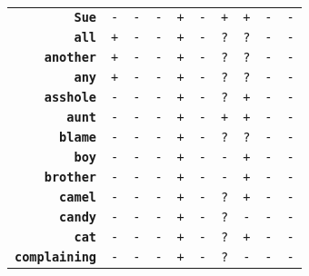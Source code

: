 \documentclass{article}
\begin{document}
\begin{minipage}{\textwidth}
{\begin{tabular}{|r|c|c|c|c|c|c|c|c|c|}
    \textbf{\texttt{Sue}} & \texttt{-}
    & \texttt{-} & \texttt{-}
    & \texttt{+} & \texttt{-}
    & \texttt{+} & \texttt{+}
    & \texttt{-} & \texttt{-} \\
    \textbf{\texttt{all}} & \texttt{+}
    & \texttt{-} & \texttt{-}
    & \texttt{+} & \texttt{-}
    & \texttt{?} & \texttt{?}
    & \texttt{-} & \texttt{-} \\
    \textbf{\texttt{another}} & \texttt{+}
    & \texttt{-} & \texttt{-}
    & \texttt{+} & \texttt{-}
    & \texttt{?} & \texttt{?}
    & \texttt{-} & \texttt{-} \\
    \textbf{\texttt{any}} & \texttt{+}
    & \texttt{-} & \texttt{-}
    & \texttt{+} & \texttt{-}
    & \texttt{?} & \texttt{?}
    & \texttt{-} & \texttt{-} \\
    \textbf{\texttt{asshole}} & \texttt{-}
    & \texttt{-} & \texttt{-}
    & \texttt{+} & \texttt{-}
    & \texttt{?} & \texttt{+}
    & \texttt{-} & \texttt{-} \\
    \textbf{\texttt{aunt}} & \texttt{-}
    & \texttt{-} & \texttt{-}
    & \texttt{+} & \texttt{-}
    & \texttt{+} & \texttt{+}
    & \texttt{-} & \texttt{-} \\
    \textbf{\texttt{blame}} & \texttt{-}
    & \texttt{-} & \texttt{-}
    & \texttt{+} & \texttt{-}
    & \texttt{?} & \texttt{?}
    & \texttt{-} & \texttt{-} \\
    \textbf{\texttt{boy}} & \texttt{-}
    & \texttt{-} & \texttt{-}
    & \texttt{+} & \texttt{-}
    & \texttt{-} & \texttt{+}
    & \texttt{-} & \texttt{-} \\
    \textbf{\texttt{brother}} & \texttt{-}
    & \texttt{-} & \texttt{-}
    & \texttt{+} & \texttt{-}
    & \texttt{-} & \texttt{+}
    & \texttt{-} & \texttt{-} \\
    \textbf{\texttt{camel}} & \texttt{-}
    & \texttt{-} & \texttt{-}
    & \texttt{+} & \texttt{-}
    & \texttt{?} & \texttt{+}
    & \texttt{-} & \texttt{-} \\
    \textbf{\texttt{candy}} & \texttt{-}
    & \texttt{-} & \texttt{-}
    & \texttt{+} & \texttt{-}
    & \texttt{?} & \texttt{-}
    & \texttt{-} & \texttt{-} \\
    \textbf{\texttt{cat}} & \texttt{-}
    & \texttt{-} & \texttt{-}
    & \texttt{+} & \texttt{-}
    & \texttt{?} & \texttt{+}
    & \texttt{-} & \texttt{-} \\
    \textbf{\texttt{complaining}} & \texttt{-}
    & \texttt{-} & \texttt{-}
    & \texttt{+} & \texttt{-}
    & \texttt{?} & \texttt{-}
    & \texttt{-} & \texttt{-} \\

\end{tabular}}
\end{minipage}
\end{document}
